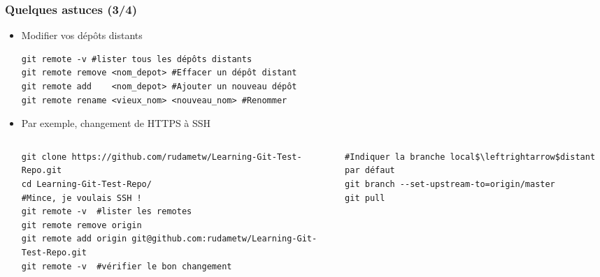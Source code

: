 \documentclass[table,tikz,12pt,svgnames]{beamer}
\begin{document}
\begin{frame}[fragile]
\frametitle{Quelques astuces (3/4)}
\vspace{-1em}
\begin{block}{}
\begin{itemize}
\item Modifier vos dépôts distants
\begin{adjustwidth}{-3em}{0cm}
\begin{verbatim}
git remote -v #lister tous les dépôts distants
git remote remove <nom_depot> #Effacer un dépôt distant
git remote add    <nom_depot> #Ajouter un nouveau dépôt
git remote rename <vieux_nom> <nouveau_nom> #Renommer
\end{verbatim}
\end{adjustwidth}

\PAUSE

\item Par exemple, changement de HTTPS à SSH
\begin{adjustwidth}{-3.9em}{0cm}
\begin{columns}
\column{\dimexpr\linewidth+24pt}
\begin{verbatim}
git clone https://github.com/rudametw/Learning-Git-Test-Repo.git
cd Learning-Git-Test-Repo/
#Mince, je voulais SSH !
git remote -v  #lister les remotes
git remote remove origin
git remote add origin git@github.com:rudametw/Learning-Git-Test-Repo.git
git remote -v  #vérifier le bon changement
\end{verbatim}
\PAUSE
\begin{verbatim}
#Indiquer la branche local$\leftrightarrow$distant par défaut
git branch --set-upstream-to=origin/master
git pull
\end{verbatim}
\end{columns}
\end{adjustwidth}




\end{itemize}
\end{block}
\end{frame}
\end{document}
